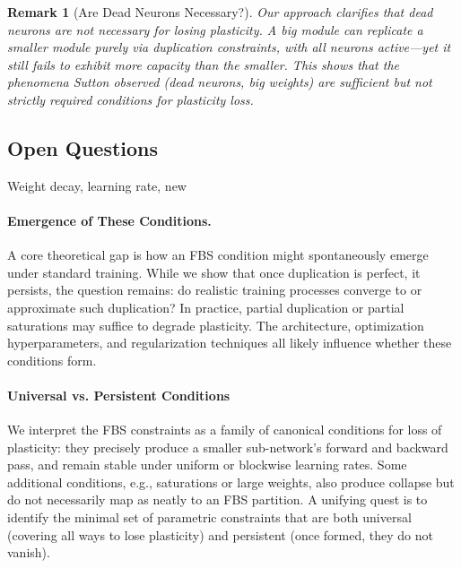 \documentclass[11pt]{article}
\newtheorem{remark}{Remark}[section]
\begin{document}
\begin{remark}[Are Dead Neurons Necessary?]
Our approach clarifies that dead neurons are not necessary for losing plasticity. A big module can replicate a smaller module purely via duplication constraints, with all neurons active---yet it still fails to exhibit more capacity than the smaller. This shows that the phenomena Sutton observed (dead neurons, big weights) are sufficient but not strictly required conditions for plasticity loss.
\end{remark}

\subsection{Open Questions}

Weight decay, learning rate, new 

\paragraph{Emergence of These Conditions.} A core theoretical gap is how an FBS condition might spontaneously emerge under standard training. While we show that once duplication is perfect, it persists, the question remains: do realistic training processes converge to or approximate such duplication? In practice, partial duplication or partial saturations may suffice to degrade plasticity. The architecture, optimization hyperparameters, and regularization techniques all likely influence whether these conditions form.

\paragraph{Universal vs. Persistent Conditions} We interpret the FBS constraints as a family of canonical conditions for loss of plasticity: they precisely produce a smaller sub-network's forward and backward pass, and remain stable under uniform or blockwise learning rates. Some additional conditions, e.g., saturations or large weights, also produce collapse but do not necessarily map as neatly to an FBS partition. A unifying quest is to identify the minimal set of parametric constraints that are both universal (covering all ways to lose plasticity) and persistent (once formed, they do not vanish).

\end{document}
